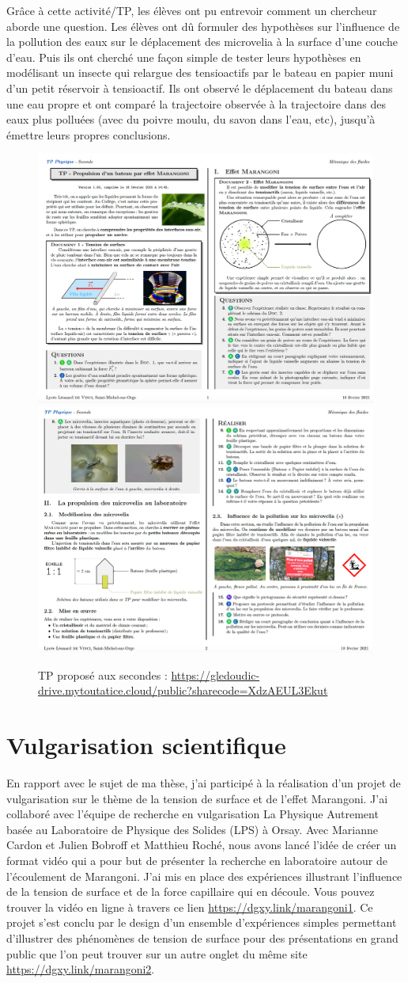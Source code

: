 \documentclass[french, 10pt]{article}
\begin{document}
Grâce à cette activité/TP, les élèves ont pu entrevoir comment un chercheur aborde une question. Les élèves ont dû formuler des hypothèses sur l'influence de la pollution des eaux sur le déplacement des microvelia à la surface d'une couche d'eau. Puis ils ont cherché une façon simple de tester leurs hypothèses en modélisant un insecte qui relargue des tensioactifs par le bateau en papier muni d'un petit réservoir à tensioactif. Ils ont observé le déplacement du bateau dans une eau propre et ont comparé la trajectoire observée à la trajectoire dans des eaux plus polluées (avec du poivre moulu, du savon dans l'eau, etc), jusqu'à émettre leurs propres conclusions.

\begin{figure}[ht]
  \includegraphics[width=.5\linewidth]{TP_Marangoni1.png}
  \includegraphics[width=.5\linewidth]{TP_Marangoni2.png}
  \caption{TP proposé aux secondes : \url{https://gledoudic-drive.mytoutatice.cloud/public?sharecode=XdzAEUL3Ekut}}
\end{figure}

\section{Vulgarisation scientifique}

En rapport avec le sujet de ma thèse, j'ai participé à la réalisation d'un projet de vulgarisation sur le thème de la tension de surface et de l'effet Marangoni. J'ai collaboré avec l'équipe de recherche en vulgarisation \og La Physique Autrement \fg{} basée au Laboratoire de Physique des Solides (LPS) à Orsay. Avec Marianne Cardon et Julien Bobroff et Matthieu Roché, nous avons lancé l'idée de créer un format vidéo qui a pour but de présenter la recherche en laboratoire autour de l'écoulement de Marangoni. J'ai mis en place des expériences illustrant l'influence de la tension de surface et de la force capillaire qui en découle. Vous pouvez trouver la vidéo en ligne à travers ce lien \url{https://dgxy.link/marangoni1}. Ce projet s'est conclu par le design d'un ensemble d'expériences simples permettant d'illustrer des phénomènes de tension de surface pour des présentations en grand public que l'on peut trouver sur un autre onglet du même site \url{https://dgxy.link/marangoni2}.\medskip
\end{document}
